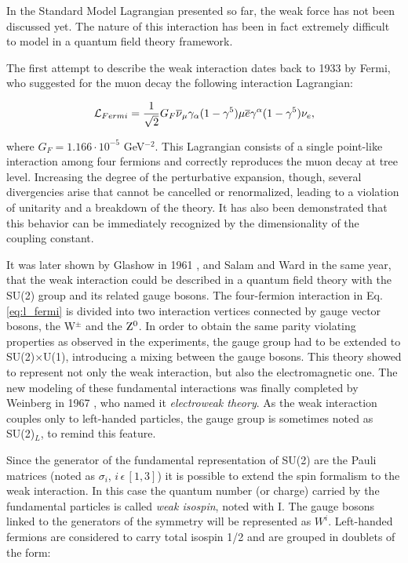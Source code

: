 In the Standard Model Lagrangian presented so far, the weak force has not been discussed yet. The nature of this interaction has been in fact extremely difficult to model in a quantum field theory framework.

The first attempt to describe the weak interaction dates back to 1933 by Fermi, who suggested for the muon decay the following interaction Lagrangian:

\begin{equation}
\mathcal{L}_{Fermi} = \dfrac{1}{\sqrt{2}} G_F \overline{\nu}_\mu \gamma_\alpha (1-\gamma^5) \mu \overline{e} \gamma^\alpha (1-\gamma^5) \nu_e,
\label{eq:l_fermi}
\end{equation}

where $G_F = 1.166 \cdot 10^{-5}$ GeV$^{-2}$. This Lagrangian consists of a single point-like interaction among four fermions and correctly reproduces the muon decay at tree level. Increasing the degree of the perturbative expansion, though, several divergencies arise that cannot be cancelled or renormalized, leading to a violation of unitarity and a breakdown of the theory. It has also been demonstrated that this behavior can be immediately recognized by the dimensionality of the coupling constant.

It was later shown by Glashow in 1961 \cite{Glashow:1961tr}, and Salam and Ward \cite{Salam:1961en} in the same year, that the weak interaction could be described in a quantum field theory with the SU(2) group and its related gauge bosons. 
The four-fermion interaction in Eq. \ref{eq:l_fermi} is divided into two interaction vertices connected by gauge vector bosons, the W$^\pm$ and the $\mathrm{Z}^0$. In order to obtain the same parity violating properties as observed in the experiments, the gauge group had to be extended to SU(2)$\times$U(1), introducing a mixing between the gauge bosons. This theory showed to represent not only the weak interaction, but also the electromagnetic one. 
The new modeling of these fundamental interactions was finally completed by Weinberg in 1967 \cite{Weinberg:1967tq}, who named it \emph{electroweak theory}. 
As the weak interaction couples only to left-handed particles, the gauge group is sometimes noted as SU(2)$_L$, to remind this feature.

Since the generator of the fundamental representation of SU(2) are the Pauli matrices (noted as $\sigma_i$, $i \, \epsilon \, [1,3]$) it is possible to extend the spin formalism to the weak interaction. In this case the quantum number (or charge) carried by the fundamental particles is called \emph{weak isospin}, noted with I. The gauge bosons linked to the generators of the symmetry will be represented as $W^i$. Left-handed fermions are considered to carry total isospin 1/2 and are grouped in doublets of the form:


